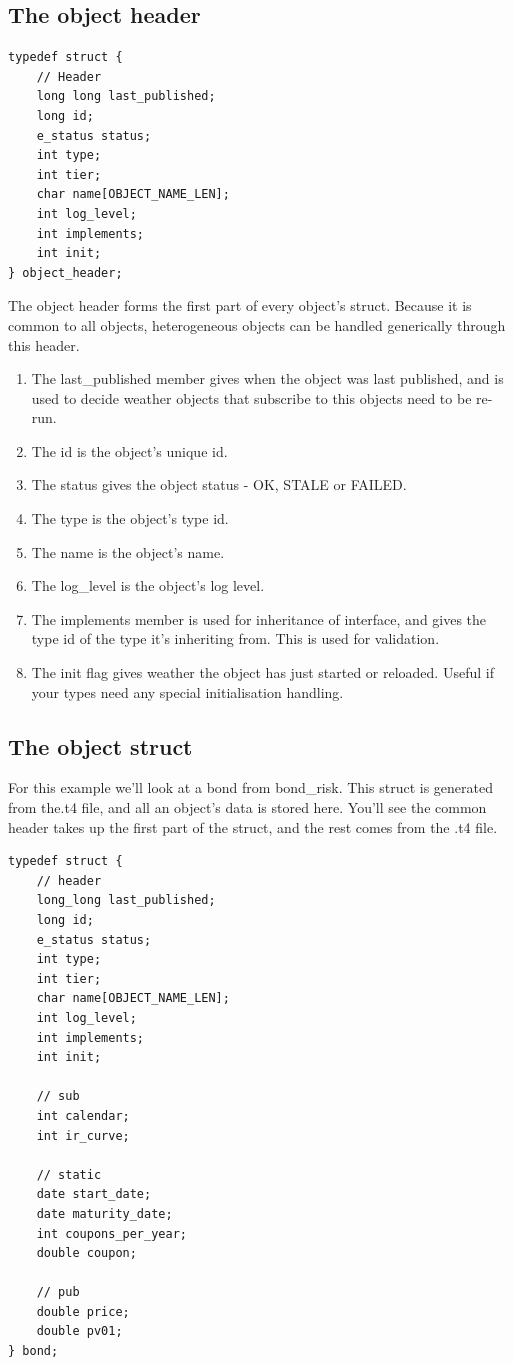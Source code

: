 \documentclass{report}
\begin{document}
\subsection{The object header}

\begin{verbatim}
typedef struct {
    // Header
    long long last_published;
    long id;
    e_status status;
    int type;
    int tier;
    char name[OBJECT_NAME_LEN];
    int log_level;
    int implements;
    int init;
} object_header;
\end{verbatim}

The object header forms the first part of every object's struct. Because it is common to all objects, heterogeneous objects can be handled generically through this header.


\begin{enumerate}
\item The last_published member gives when the object was last published, and is used to decide weather objects that subscribe to this objects need to be re-run.
\item The id is the object's unique id.
\item The status gives the object status - OK, STALE or FAILED.
\item The type is the object's type id.
\item The name is the object's name.
\item The log_level is the object's log level.
\item The implements member is used for inheritance of interface, and gives the type id of the type it's inheriting from. This is used for validation.
\item The init flag gives weather the object has just started or reloaded. Useful if your types need any special initialisation handling.
\end{enumerate}

\subsection{The object struct}

For this example we'll look at a bond from bond_risk. This struct is generated from the.t4 file, and all an object's data is stored here. You'll see the common header takes up the first part of the struct, and the rest comes from the .t4 file.

\begin{verbatim}
typedef struct {
    // header
    long_long last_published;
    long id;
    e_status status;
    int type;
    int tier;
    char name[OBJECT_NAME_LEN];
    int log_level;
    int implements;
    int init;

    // sub
    int calendar;
    int ir_curve;

    // static
    date start_date;
    date maturity_date;
    int coupons_per_year;
    double coupon;

    // pub
    double price;
    double pv01;
} bond;
\end{verbatim}
\end{document}
